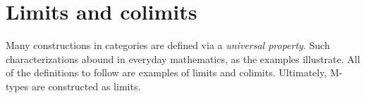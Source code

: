 \documentclass[a5paper]{article}
\newcommand{\dual}[2]{
  \begin{itemize}\renewcommand{\labelitemi}{$\circ $}
    \itemsep0em
    \item #1
    \item #2
   \end{itemize}
}
\begin{document}
\section{Limits and colimits}
\label{sec:limits-and-colimits}

Many constructions in categories are defined via a \textit{universal property}.
Such characterizations abound in everyday mathematics, as the examples
illustrate. All of the definitions to follow are examples of limits and colimits.
Ultimately, M-types are constructed as limits.

\end{document}
